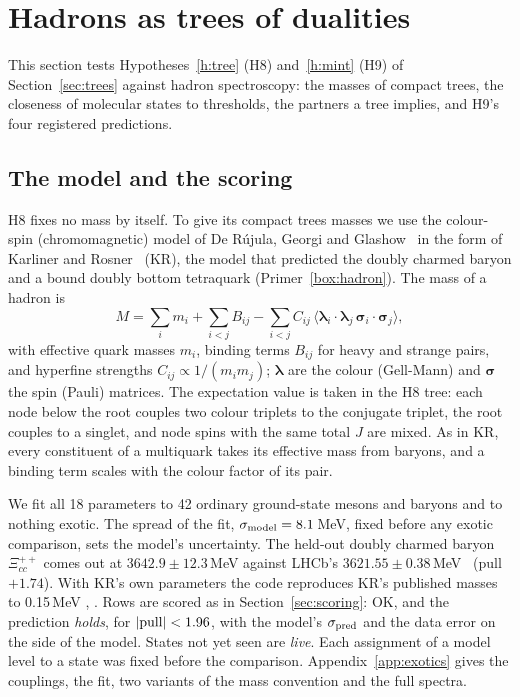 \section{Hadrons as trees of dualities}\label{sec:exotics}

This section tests Hypotheses~\ref{h:tree} (H8) and~\ref{h:mint} (H9) of Section~\ref{sec:trees} against hadron spectroscopy: the
masses of compact trees, the closeness of molecular states to thresholds, the partners a tree implies, and H9's four registered
predictions.

\subsection{The model and the scoring}\label{sec:exotics-model}

H8 fixes no mass by itself. To give its compact trees masses we use the colour-spin (chromomagnetic) model of De R\'ujula, Georgi and
Glashow~\cite{derujula1975} in the form of Karliner and Rosner~\cite{karliner2014,karliner2017} (KR), the model that predicted the doubly
charmed baryon and a bound doubly bottom tetraquark (Primer~\ref{box:hadron}). The mass of a hadron is
\begin{equation}\label{eq:exo-H}
M=\sum_i m_i+\sum_{i<j}B_{ij}-\sum_{i<j}C_{ij}\,\langle\boldsymbol\lambda_i\!\cdot\!\boldsymbol\lambda_j\,
\boldsymbol\sigma_i\!\cdot\!\boldsymbol\sigma_j\rangle ,
\end{equation}
with effective quark masses $m_i$, binding terms $B_{ij}$ for heavy and strange pairs, and hyperfine strengths $C_{ij}\propto
1/(m_im_j)$; $\boldsymbol\lambda$ are the colour (Gell-Mann) and $\boldsymbol\sigma$ the spin (Pauli) matrices. The expectation value is
taken in the H8 tree: each node below the root couples two colour triplets to the conjugate triplet, the root couples to a singlet, and
node spins with the same total $J$ are mixed. As in KR, every constituent of a multiquark takes its effective mass from baryons, and a
binding term scales with the colour factor of its pair.

We fit all 18 parameters to 42 ordinary ground-state mesons and baryons and to nothing exotic. The spread of the fit,
$\sigma_{\rm model}=8.1$\,MeV, fixed before any exotic comparison, sets the model's uncertainty. The held-out doubly charmed baryon
$\Xi_{cc}^{++}$ comes out at $3642.9\pm12.3$\,MeV against LHCb's $3621.55\pm0.38$\,MeV~\cite{lhcb2020j} (pull $+1.74$). With KR's own
parameters the code reproduces KR's published masses to 0.15\,MeV , . Rows are scored as in
Section~\ref{sec:scoring}: OK, and the prediction \emph{holds}, for $|{\rm pull}|<1.96$, with the model's $\sigma_{\rm pred}$ and the
data error on the side of the model. States not yet seen are \emph{live}. Each assignment of a model level to a state was fixed before
the comparison. Appendix~\ref{app:exotics} gives the couplings, the fit, two variants of the mass convention and the full spectra.

